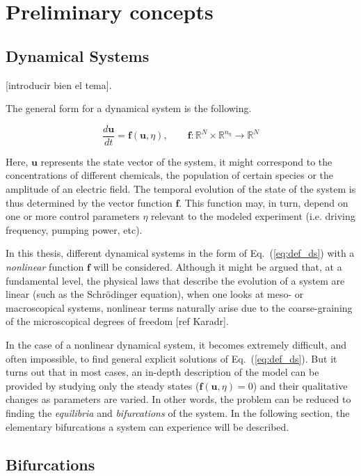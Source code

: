 \chapter{Preliminary concepts}

\section{Dynamical Systems}

[introducir bien el tema]. 

The general form for a dynamical system is the following.

\begin{equation}
    \dfrac{d\bm{u}}{dt} = \bm{f}(\bm{u}, \eta), \qquad \bm{f} : \mathbb{R}^N \times \mathbb{R}^{n_\eta} \to \mathbb{R}^N
    \label{eq:def_ds}
\end{equation}

Here, $\bm{u}$ represents the state vector of the system, it might correspond to the
concentrations of different chemicals, the population of certain species or the amplitude
of an electric field. The temporal evolution of the state of the system is thus determined by 
the vector function $\bm{f}$. This function may, in turn, depend on one or more control
parameters $\eta$ relevant to the modeled experiment (i.e. driving frequency, pumping power, etc).

In this thesis, different dynamical systems in the form of Eq.~(\ref{eq:def_ds}) with a {\em nonlinear} function
$\bm{f}$ will be considered. Although it might be argued that, at a fundamental level, the physical laws
that describe the evolution of a system are linear (such as the Schrödinger equation), when one looks at meso- or macroscopical
systems, nonlinear terms naturally arise due to the coarse-graining of the microscopical degrees of freedom [ref Karadr].


In the case of a nonlinear dynamical system, it becomes extremely difficult, and often impossible, to find
general explicit solutions of Eq.~(\ref{eq:def_ds}). But it turns out that in most cases, an in-depth
description of the model can be provided by studying only the steady states ($\bm{f}(\bm{u}, \eta) = 0$) and their qualitative changes as parameters 
are varied. In other words, the problem can be reduced to finding the {\em equilibria} and {\em bifurcations} of the system.
In the following section, the elementary bifurcations a system can experience will be described.

\section{Bifurcations}

